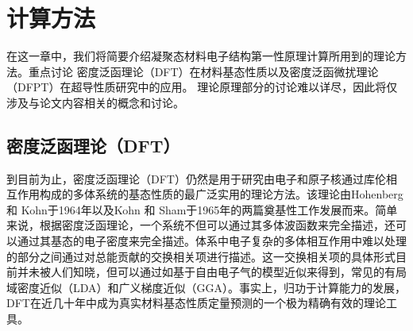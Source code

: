 \chapter{计算方法}\label{chapter:theory}
\newcommand{\ubm}[1]{\underline{\bm{#1}}}

在这一章中，我们将简要介绍凝聚态材料电子结构第一性原理计算所用到的理论方法。重点讨论
密度泛函理论（DFT）在材料基态性质以及密度泛函微扰理论（DFPT）在超导性质研究中的应用。
理论原理部分的讨论难以详尽，因此将仅涉及与论文内容相关的概念和讨论。

\section{密度泛函理论（DFT）}

到目前为止，密度泛函理论（DFT）仍然是用于研究由电子和原子核通过库伦相互作用构成的多体系统的基态性质的最广泛实用的理论方法。该理论由Hohenberg 和 Kohn\cite{hohenberg1964inhomogeneous}于1964年以及Kohn 和 Sham\cite{kohn1965self}于1965年的两篇奠基性工作发展而来。简单来说，根据密度泛函理论，一个系统不但可以通过其多体波函数来完全描述，还可以通过其基态的电子密度来完全描述。体系中电子复杂的多体相互作用中难以处理的部分之间通过对总能贡献的交换相关项进行描述。这一交换相关项的具体形式目前并未被人们知晓，但可以通过如基于自由电子气的模型近似来得到，常见的有局域密度近似（LDA）和广义梯度近似（GGA）。事实上，归功于计算能力的发展，DFT在近几十年中成为真实材料基态性质定量预测的一个极为精确有效的理论工具。

